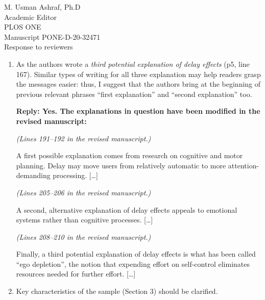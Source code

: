 \documentclass[10pt, letterpaper]{letter}
\newenvironment{QandA}
{\begin{enumerate}[
    label={\bfseries Comment \arabic*:}, 
    wide,
    ref={Comment \arabic*}]}
{\end{enumerate}}
\newenvironment{revised}[2]
{%
\begin{displayquote}
    \medskip
    \begin{flushright}
        \itshape{(Lines \numrange{#1}{#2} in the revised manuscript.)}\normalfont%
    \end{flushright}
    \medskip

}
{\end{displayquote}}
\newenvironment{answered}
{\medskip\par\bfseries Reply: \normalfont}
{\par\noindent\makebox[\linewidth]{\rule{\textwidth}{0.4pt}}\bigskip}
\begin{document}
\begin{letter}{
    M. Usman Ashraf, Ph.D\\
    Academic Editor\\
    PLOS ONE\\
    \medskip
    Manuscript PONE-D-20-32471\\
    Response to reviewers\\
}
\begin{QandA}
\begin{answered}
\begin{revised}{146}{154}
            Accordingly, in the following we review background work in the areas of 
        \end{revised}
    \end{answered}

    \item As the authors wrote a \emph{third potential explanation of delay effects} (p5, line 167).
    Similar types of writing for all three explanation may help readers grasp the messages easier: thus, I suggest that the authors bring at the beginning of previous relevant phrases ``first explanation'' and ``second explanation'' too.

    \begin{answered}
        Yes.
        The explanations in question have been modified in the revised manuscript:

        \begin{revised}{191}{192}
            A first possible explanation comes from research on cognitive and motor planning. 
            Delay may move users from relatively automatic to more attention-demanding processing. 
            [\ldots]
        \end{revised}

        \begin{revised}{205}{206}
            A second, alternative explanation of delay effects appeals to emotional systems rather than cognitive processes.
            [\ldots]
        \end{revised}
            
        \begin{revised}{208}{210}
            Finally, a third potential explanation of delay effects is what has been called ``ego depletion'', the notion that expending effort on self-control eliminates resources needed for further effort.
            [\ldots]
        \end{revised}
    \end{answered}

    \item Key characteristics of the sample (Section 3) should be clarified.
    

\end{QandA}
\end{letter}
\end{document}
